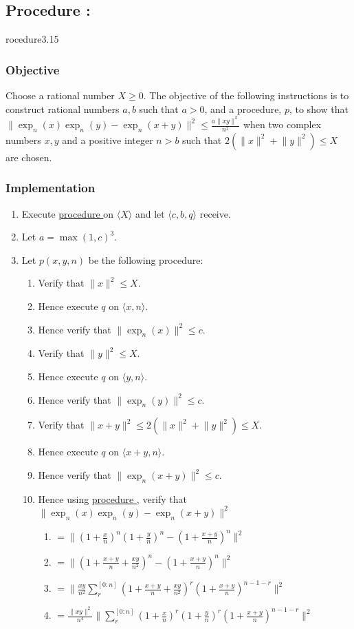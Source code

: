 \documentclass{article}
\newcounter{procedure}[part]
\newcommand{\procedure}[1]{\subsection*{Procedure \thepart:\theprocedure}\label{sec:procedure #1}\global\expandafter\edef\csname procedure#1\endcsname{\thepart:\theprocedure}\addtocounter{procedure}{1}}
\newcommand{\objective}{\subsubsection*{Objective}}
\newcommand{\implementation}{\subsubsection*{Implementation}}
\newcommand{\procedurehr}[1]{\hyperref[sec:procedure #1]{procedure \expandafter\csname procedure#1\endcsname}}
\begin{document}
\begin{multicols}{2}
\begin{enumerate}
				\end{enumerate}
		\procedure{3.15}
			\objective
				Choose a rational number $X\ge 0$. The objective of the following instructions is to construct rational numbers $a,b$ such that $a>0$, and a procedure, $p$, to show that $\lVert\exp_n(x)\exp_n(y)-\exp_n(x+y)\rVert^2\le\frac{a\lVert xy\rVert^2}{n^2}$ when two complex numbers $x,y$ and a positive integer $n>b$ such that $2(\lVert x\rVert^2+\lVert y\rVert^2)\le X$ are chosen.
			\implementation
				\begin{enumerate}
					\item Execute \procedurehr{3.13} on $\langle X\rangle$ and let $\langle c,b,q\rangle$ receive.
					\item Let $a=\max(1,c)^3$.
					\item Let $p(x,y,n)$ be the following procedure:
					\begin{enumerate}
						\item Verify that $\lVert x\rVert^2\le X$.
						\item Hence execute $q$ on $\langle x,n\rangle$.
						\item Hence verify that $\lVert\exp_n(x)\rVert^2\le c$.
						\item Verify that $\lVert y\rVert^2\le X$.
						\item Hence execute $q$ on $\langle y,n\rangle$.
						\item Hence verify that $\lVert\exp_n(y)\rVert^2\le c$.
						\item Verify that $\lVert x+y\rVert^2\le 2(\lVert x\rVert^2+\lVert y\rVert^2)\le X$.
						\item Hence execute $q$ on $\langle x+y,n\rangle$.
						\item Hence verify that $\lVert\exp_n(x+y)\rVert^2\le c$.
						\item Hence using \procedurehr{3.04}, verify that $\lVert\exp_n(x)\exp_n(y)-\exp_n(x+y)\rVert^2$
						\begin{enumerate}
							\item $=\lVert(1+\frac{x}{n})^n(1+\frac{y}{n})^n-(1+\frac{x+y}{n})^n\rVert^2$
							\item $=\lVert(1+\frac{x+y}{n}+\frac{xy}{n^2})^n-(1+\frac{x+y}{n})^n\rVert^2$
							\item $=\lVert\frac{xy}{n^2}\sum_r^{[0:n]}(1+\frac{x+y}{n}+\frac{xy}{n^2})^r(1+\frac{x+y}{n})^{n-1-r}\rVert^2$
							\item $=\frac{\lVert xy\rVert^2}{n^4}\lVert\sum_r^{[0:n]}(1+\frac{x}{n})^r(1+\frac{y}{n})^r(1+\frac{x+y}{n})^{n-1-r}\rVert^2$

\end{enumerate}
\end{enumerate}
\end{enumerate}
\end{multicols}
\end{document}
